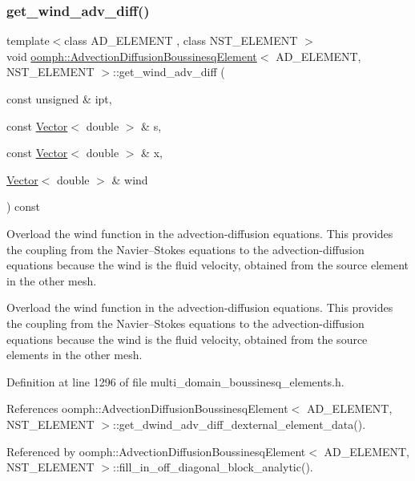 \subsubsection{\texorpdfstring{get\+\_\+wind\+\_\+adv\+\_\+diff()}{get\_wind\_adv\_diff()}}
{\footnotesize\ttfamily template$<$class A\+D\+\_\+\+E\+L\+E\+M\+E\+NT , class N\+S\+T\+\_\+\+E\+L\+E\+M\+E\+NT $>$ \\
void \hyperlink{classoomph_1_1AdvectionDiffusionBoussinesqElement}{oomph\+::\+Advection\+Diffusion\+Boussinesq\+Element}$<$ A\+D\+\_\+\+E\+L\+E\+M\+E\+NT, N\+S\+T\+\_\+\+E\+L\+E\+M\+E\+NT $>$\+::get\+\_\+wind\+\_\+adv\+\_\+diff (\begin{DoxyParamCaption}\item[{const unsigned \&}]{ipt,  }\item[{const \hyperlink{classoomph_1_1Vector}{Vector}$<$ double $>$ \&}]{s,  }\item[{const \hyperlink{classoomph_1_1Vector}{Vector}$<$ double $>$ \&}]{x,  }\item[{\hyperlink{classoomph_1_1Vector}{Vector}$<$ double $>$ \&}]{wind }\end{DoxyParamCaption}) const}



Overload the wind function in the advection-\/diffusion equations. This provides the coupling from the Navier--Stokes equations to the advection-\/diffusion equations because the wind is the fluid velocity, obtained from the source element in the other mesh. 

Overload the wind function in the advection-\/diffusion equations. This provides the coupling from the Navier--Stokes equations to the advection-\/diffusion equations because the wind is the fluid velocity, obtained from the source elements in the other mesh. 

Definition at line 1296 of file multi\+\_\+domain\+\_\+boussinesq\+\_\+elements.\+h.



References oomph\+::\+Advection\+Diffusion\+Boussinesq\+Element$<$ A\+D\+\_\+\+E\+L\+E\+M\+E\+N\+T, N\+S\+T\+\_\+\+E\+L\+E\+M\+E\+N\+T $>$\+::get\+\_\+dwind\+\_\+adv\+\_\+diff\+\_\+dexternal\+\_\+element\+\_\+data().



Referenced by oomph\+::\+Advection\+Diffusion\+Boussinesq\+Element$<$ A\+D\+\_\+\+E\+L\+E\+M\+E\+N\+T, N\+S\+T\+\_\+\+E\+L\+E\+M\+E\+N\+T $>$\+::fill\+\_\+in\+\_\+off\+\_\+diagonal\+\_\+block\+\_\+analytic().

